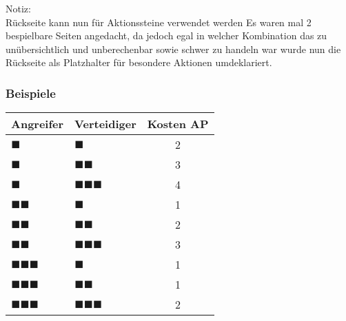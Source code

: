 \documentclass{article}
\begin{document}
	\vspace*{0.2cm}
	
	\begin{flushleft}
	Notiz:\\
	Rückseite kann nun für Aktionssteine verwendet werden
	Es waren mal 2 bespielbare Seiten angedacht, da jedoch egal in welcher Kombination das zu unübersichtlich und unberechenbar sowie schwer zu handeln war wurde nun die Rückseite als Platzhalter für besondere Aktionen umdeklariert.
	\end{flushleft}
	
	
	\subsubsection*{Beispiele}
	
	\begin{tabular}{llc}
	Angreifer & Verteidiger & Kosten AP \\ \hline 
	$\blacksquare$ & $\blacksquare$ & 2 \\
	$\blacksquare$ & $\blacksquare\blacksquare$ & 3 \\
	$\blacksquare$ & $\blacksquare\blacksquare\blacksquare$ & 4 \\
	
	$\blacksquare\blacksquare$ & $\blacksquare$ & 1 \\ 
	$\blacksquare\blacksquare$ & $\blacksquare\blacksquare$ & 2 \\ 
	$\blacksquare\blacksquare$ & $\blacksquare\blacksquare\blacksquare$ & 3 \\ 
	
	$\blacksquare\blacksquare\blacksquare$ & $\blacksquare$ & 1 \\ 
	$\blacksquare\blacksquare\blacksquare$ & $\blacksquare\blacksquare$ & 1 \\ 
	$\blacksquare\blacksquare\blacksquare$ & $\blacksquare\blacksquare\blacksquare$ & 2 \\ 
	\end{tabular} 
	
	
	\begin{figure}[h]
	\end{figure}
	
\end{document}
